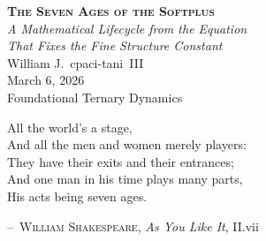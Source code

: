 \documentclass[12pt, letterpaper]{article}
\theoremstyle{plain}
\theoremstyle{definition}
\theoremstyle{remark}
\begin{document}
\begin{center}
\vspace*{0.4cm}
{\LARGE\bfseries\scshape The Seven Ages of the Softplus}\\[0.5em]
{\large\itshape A Mathematical Lifecycle from the Equation\\
That Fixes the Fine Structure Constant}\\[1.8em]
{\large William J.~cpaci-tani~III}\\[1.6em]
{\normalsize March 6, 2026}\\[0.3em]
{\small Foundational Ternary Dynamics}
\end{center}

\vspace{0.6em}

\epigraph{All the world's a stage,\\
And all the men and women merely players:\\
They have their exits and their entrances;\\
And one man in his time plays many parts,\\
His acts being seven ages.}%
{\textsc{--~William Shakespeare}, \textit{As You Like It}, II.vii}

\vspace{0.5em}
\end{document}
